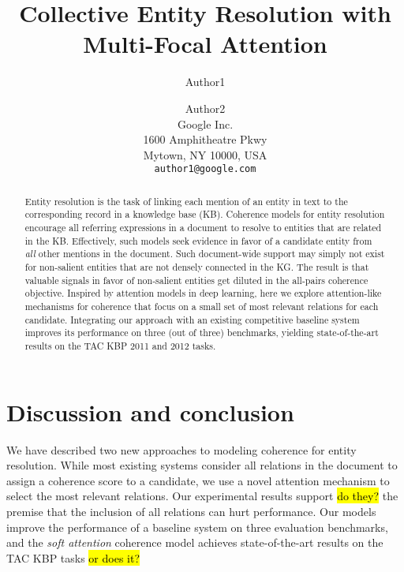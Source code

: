 \documentclass[11pt]{article}
\title{Collective Entity Resolution with Multi-Focal Attention}
\author{Author1 \and Author2\\
	    Google Inc. \\
	    1600 Amphitheatre Pkwy\\
	    Mytown, NY 10000, USA\\
	    {\tt author1@google.com}}
\date{}
\begin{document}
\maketitle

\begin{abstract}
Entity resolution is the task of linking each mention of an entity in
text to the corresponding record in a knowledge base (KB).  Coherence
models for entity resolution encourage all referring expressions in a
document to resolve to entities that are related in the KB.
Effectively, such models seek evidence in favor of a candidate entity
from \emph{all} other mentions in the document.  Such document-wide
support may simply not exist for non-salient entities that are not
densely connected in the KG.  The result is that valuable signals in
favor of non-salient entities get diluted in the all-pairs coherence
objective.  Inspired by attention models in deep learning, here we
explore attention-like mechanisms for coherence that focus on a small
set of most relevant relations for each candidate.  Integrating our
approach with an existing competitive baseline system improves its
performance on three (out of three) benchmarks, yielding
state-of-the-art results on the TAC KBP 2011 and 2012 tasks.
\end{abstract}










\section{Discussion and conclusion}
We have described two new approaches to modeling coherence for entity resolution. While most existing systems consider all relations in the document to assign a coherence score to a candidate, we use a novel attention mechanism to select the most relevant relations. Our experimental results support \hl{do they?} the premise that the inclusion of all relations can hurt performance. Our models improve the performance of a baseline system on three evaluation benchmarks, and the \emph{soft attention} coherence model achieves state-of-the-art results on the TAC KBP tasks \hl{or does it?}




\small


\normalsize 
\end{document}
